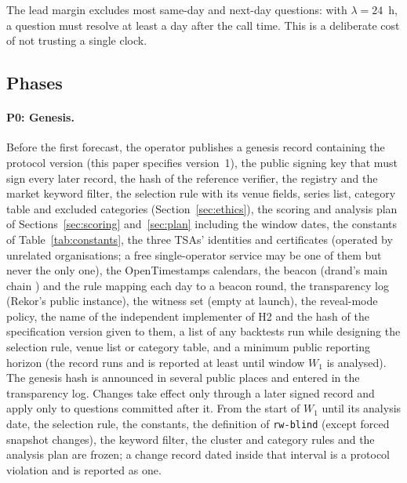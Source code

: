 \documentclass[11pt]{article}
\begin{document}
The lead margin excludes most same-day and next-day questions: with $\lambda = 24$~h, a question must resolve at least a day after the call time. This is a deliberate cost of not trusting a single clock.

\subsection{Phases}

\paragraph{P0: Genesis.} Before the first forecast, the operator publishes a genesis record containing the protocol version (this paper specifies version~1), the public signing key that must sign every later record, the hash of the reference verifier, the registry and the market keyword filter, the selection rule with its venue fields, series list, category table and excluded categories (Section~\ref{sec:ethics}), the scoring and analysis plan of Sections~\ref{sec:scoring} and~\ref{sec:plan} including the window dates, the constants of Table~\ref{tab:constants}, the three TSAs' identities and certificates (operated by unrelated organisations; a free single-operator service may be one of them but never the only one), the OpenTimestamps calendars, the beacon (drand's main chain \citep{drand}) and the rule mapping each day to a beacon round, the transparency log (Rekor's public instance), the witness set (empty at launch), the reveal-mode policy, the name of the independent implementer of H2 and the hash of the specification version given to them, a list of any backtests run while designing the selection rule, venue list or category table, and a minimum public reporting horizon (the record runs and is reported at least until window $W_1$ is analysed). The genesis hash is announced in several public places and entered in the transparency log. Changes take effect only through a later signed record and apply only to questions committed after it. From the start of $W_1$ until its analysis date, the selection rule, the constants, the definition of \texttt{rw-blind} (except forced snapshot changes), the keyword filter, the cluster and category rules and the analysis plan are frozen; a change record dated inside that interval is a protocol violation and is reported as one.
\end{document}
